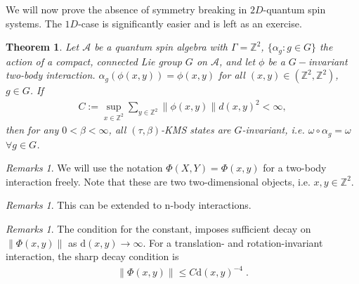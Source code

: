 \documentclass[
a4paper, %
11pt, %
onecolumn, %
openany, %
]{memoir}
\theoremstyle{definition}
\theoremstyle{remark}
\newtheorem{remarks}[definition]{Remarks}
\theoremstyle{plain}
\newtheorem{theorem}[definition]{Theorem}
\begin{document}
We will now prove the absence of symmetry breaking in $2D$-quantum spin systems. The $1D$-case is significantly easier and is left as an exercise.
\begin{theorem}
Let $\mathcal{A}$ be a quantum spin algebra with $\Gamma=\mathbb{Z}^2$, $\{\alpha_g:g\in G\}$ the action of a compact, connected Lie group $G$ on $\mathcal{A}$, and let $\phi$ be a $G-$invariant two-body interaction. $\alpha_g(\phi(x,y))=\phi(x,y)$ for all $(x,y)\in(\mathbb{Z}^2,\mathbb{Z}^2)$, $g\in G$. If \begin{align}
C:=\sup_{x\in\mathbb{Z}^2}\sum_{y\in\mathbb{Z}^2}\|\phi(x,y)\| d(x,y)^2<\infty,
\end{align}
then for any $0<\beta<\infty$, all $(\tau,\beta)$-KMS states are $G$-invariant, i.e. $\omega\circ\alpha_g=\omega$ $\forall g\in G$.
\end{theorem}
\begin{remarks}
We will use the notation $\Phi(X,Y)=\Phi({x,y})$ for a two-body interaction freely. Note that these are two two-dimensional objects, i.e. $x,y\in\mathbb{Z}^2$.
\end{remarks}
\begin{remarks}
This can be extended to n-body interactions.
\end{remarks}
\begin{remarks}
The condition for the constant, imposes sufficient decay on $\|\Phi(x,y)\|$ as $\mathrm{d}(x,y)\rightarrow\infty$. For a translation- and rotation-invariant interaction, the sharp decay condition is\begin{align}
\|\Phi(x,y)\|\leq C\mathrm{d}(x,y)^{-4}\; .
\end{align}
\end{remarks}
\end{document}
